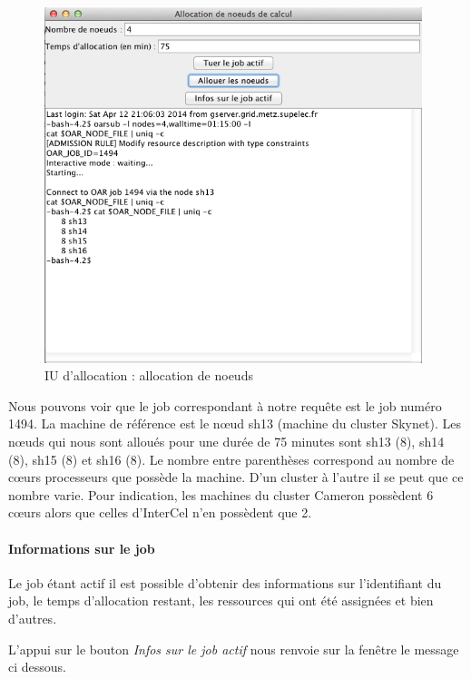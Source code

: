 \begin{figure}[h!]
  \centering
  \includegraphics[width=11cm]{images/iuallocation_ask_nodes.png}
  \caption{IU d'allocation : allocation de noeuds}
  \label{fig:iualloc_nodes}
\end{figure}

\par Nous pouvons voir que le job correspondant à notre requête est le job numéro 1494. La machine de référence est le nœud sh13 (machine du cluster Skynet). Les nœuds qui nous sont alloués pour une durée de 75 minutes sont sh13 (8), sh14 (8), sh15 (8) et sh16 (8). Le nombre entre parenthèses correspond au nombre de cœurs processeurs que possède la machine. D’un cluster à l’autre il se peut que ce nombre varie. Pour indication, les machines du cluster Cameron possèdent 6 cœurs alors que celles d’InterCel n’en possèdent que 2.

\paragraph{Informations sur le job}
\label{sec:info_job}

\par Le job étant actif il est possible d'obtenir des informations sur l'identifiant du job, le temps d'allocation restant, les ressources qui ont été assignées et bien d'autres.
\par L'appui sur le bouton \emph{Infos sur le job actif} nous renvoie sur la fenêtre le message ci dessous.

